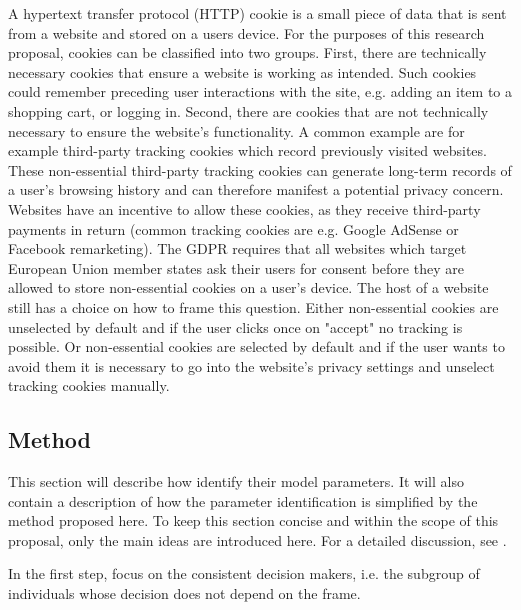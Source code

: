 A hypertext transfer protocol (HTTP) cookie is a small piece of data that is sent from
a website and stored on a users device. For the purposes of this research proposal, cookies can be classified into two groups. First, there are
technically necessary cookies that ensure a website is working as intended. Such cookies could remember preceding user
interactions with the site, e.g. adding an item to a shopping cart, or logging in. Second, there are cookies that are not technically
necessary to ensure the website's functionality. A common example are for example third-party tracking cookies which record previously visited websites.
These non-essential third-party tracking cookies can generate long-term records of a user's browsing history and can therefore manifest a potential privacy concern.
Websites have an incentive to allow these cookies, as they receive third-party payments in return (common tracking cookies are e.g. Google AdSense or Facebook remarketing).  
The GDPR requires that all websites which target European Union member states ask their users for consent
before they are allowed to store non-essential cookies on a user's device. The host of a website still
has a choice on how to frame this question. Either non-essential cookies are unselected by default and if the
user clicks once on "accept" no tracking is possible. Or non-essential cookies are selected by default and if the user wants
to avoid them it is necessary to go into the website's privacy settings and unselect tracking cookies manually.


\subsection{Method} \label{method}

This section will describe how \textcite{goldin2020} identify their model parameters. It will also contain a description
of how the parameter identification is simplified by the method proposed here.
To keep this section concise and within the scope of this proposal, only the main ideas are introduced here.
For a detailed discussion, see \textcite[p.2767]{goldin2020}.

In the first step, \textcite{goldin2020} focus on the consistent decision makers, i.e. the subgroup of individuals
whose decision does not depend on the frame. 






